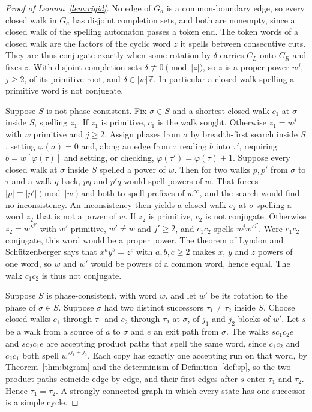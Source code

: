 \documentclass[11pt,a4paper]{article}
\theoremstyle{definition}
\theoremstyle{plain}
\begin{document}
\begin{proof}[Proof of Lemma~\ref{lem:rigid}]
No edge of \(G_a\) is a common-boundary edge, so every closed walk in \(G_a\) has disjoint completion sets, and both are
nonempty, since a closed walk of the spelling automaton passes a token end. The token words of a closed walk are the
factors of the cyclic word \(z\) it spells between consecutive cuts. They are thus conjugate exactly when some rotation
by \(\delta\) carries \(C_L\) onto \(C_R\) and fixes \(z\). With disjoint completion sets
\(\delta \not\equiv 0 \pmod{|z|}\), so \(z\) is a proper power \(w^j\), \(j \ge 2\), of its primitive root, and
\(\delta \in |w|\mathbb{Z}\). In particular a closed walk spelling a primitive word is not conjugate.

Suppose \(S\) is not phase-consistent. Fix \(\sigma \in S\) and a shortest closed walk \(c_1\) at \(\sigma\) inside
\(S\), spelling \(z_1\). If \(z_1\) is primitive, \(c_1\) is the walk sought. Otherwise \(z_1 = w^j\) with \(w\)
primitive and \(j \ge 2\). Assign phases from \(\sigma\) by breadth-first search inside \(S\), setting
\(\varphi(\sigma) = 0\) and, along an edge from \(\tau\) reading \(b\) into \(\tau'\), requiring
\(b = w[\varphi(\tau)]\) and setting, or checking, \(\varphi(\tau') = \varphi(\tau) + 1\). Suppose every closed walk at
\(\sigma\) inside \(S\) spelled a power of \(w\). Then for two walks \(p, p'\) from \(\sigma\) to \(\tau\) and a walk
\(q\) back, \(pq\) and \(p'q\) would spell powers of \(w\). That forces \(|p| \equiv |p'| \pmod{|w|}\) and both to spell
prefixes of \(w^\infty\), and the search would find no inconsistency. An inconsistency then yields a closed walk \(c_2\)
at \(\sigma\) spelling a word \(z_2\) that is not a power of \(w\). If \(z_2\) is primitive, \(c_2\) is not conjugate.
Otherwise \(z_2 = w'^{j'}\) with \(w'\) primitive, \(w' \ne w\) and \(j' \ge 2\), and \(c_1 c_2\) spells
\(w^j w'^{j'}\). Were \(c_1 c_2\) conjugate, this word would be a proper power. The theorem of Lyndon and
Sch\"utzenberger \citep{lyndon1962equation} says that \(x^a y^b = z^c\) with \(a, b, c \ge 2\) makes \(x\), \(y\) and
\(z\) powers of one word, so \(w\) and \(w'\) would be powers of a common word, hence equal. The walk \(c_1 c_2\) is
thus not conjugate.

Suppose \(S\) is phase-consistent, with word \(w\), and let \(w'\) be its rotation to the phase of \(\sigma \in S\).
Suppose \(\sigma\) had two distinct successors \(\tau_1 \ne \tau_2\) inside \(S\). Choose closed walks \(c_1\) through
\(\tau_1\) and \(c_2\) through \(\tau_2\) at \(\sigma\), of \(j_1\) and \(j_2\) blocks of \(w'\). Let \(s\) be a walk
from a source of \(a\) to \(\sigma\) and \(e\) an exit path from \(\sigma\). The walks \(s c_1 c_2 e\) and
\(s c_2 c_1 e\) are accepting product paths that spell the same word, since \(c_1 c_2\) and \(c_2 c_1\) both spell
\(w'^{j_1 + j_2}\). Each copy has exactly one accepting run on that word, by Theorem~\ref{thm:bigram} and the
determinism of Definition~\ref{def:sp}, so the two product paths coincide edge by edge, and their first edges after
\(s\) enter \(\tau_1\) and \(\tau_2\). Hence \(\tau_1 = \tau_2\). A strongly connected graph in which every state has
one successor is a simple cycle.
\end{proof}
\end{document}
